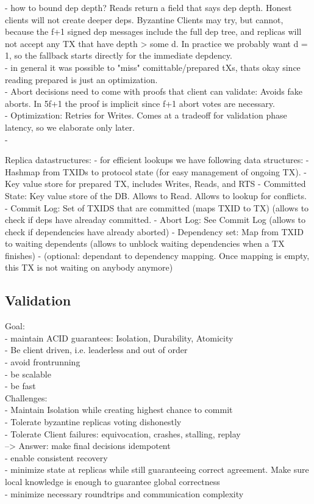 - how to bound dep depth? Reads return a field that says dep depth. Honest clients will not create deeper deps. Byzantine Clients may try, but cannot, because the f+1 signed dep messages include the full dep tree, and replicas will not accept any TX that have depth > some d. In practice we probably want d = 1, so the fallback starts directly for the immediate depdency.\\
	- in general it was possible to "miss" comittable/prepared tXs, thats okay since reading prepared is just an optimization.\\
	
- Abort decisions need to come with proofs that client can validate: Avoids fake aborts. In 5f+1 the proof is implicit since f+1 abort votes are necessary.\\
- Optimization: Retries for Writes. Comes at a tradeoff for validation phase latency, so we elaborate only later.\\
-
	
Replica datastructures:
- for efficient lookups we have following data structures:
-   Hashmap from TXIDs to protocol state (for easy management of ongoing TX). 
- Key value store for prepared TX, includes Writes, Reads, and RTS
- Committed State: Key value store of the DB. Allows to Read. Allows to lookup for conflicts.
- Commit Log: Set of TXIDS that are committed (maps TXID to TX)  (allows to check if deps have alreaday committed. 
- Abort Log: See Commit Log (allows to check if dependencies have already aborted)
- Dependency set: Map from TXID to waiting dependents (allows to unblock waiting dependencies when a TX finishes)
- (optional: dependant to dependency mapping. Once mapping is empty, this TX is not waiting on anybody anymore)



\subsection{Validation}
Goal:\\
- maintain ACID guarantees: Isolation, Durability, Atomicity\\
- Be client driven, i.e. leaderless and out of order\\
- avoid frontrunning\\
- be scalable\\
- be fast\\


Challenges:\\
- Maintain Isolation while creating highest chance to commit\\
- Tolerate byzantine replicas voting dishonestly\\
- Tolerate Client failures: equivocation, crashes, stalling, replay\\
--> Answer: make final decisions idempotent\\
- enable consistent recovery\\
- minimize state at replicas while still guaranteeing correct agreement. Make sure local knowledge is enough to guarantee global correctness\\
- minimize necessary roundtrips and communication complexity\\


